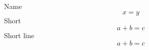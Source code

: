 \documentclass{article}
\begin{document}
Name\hrulefill
\[ x = y \]
Short \dotfill
\[ a + b = c \]
Short line \hspace{2cm}%
\[ a + b = c \]
\end{document}
